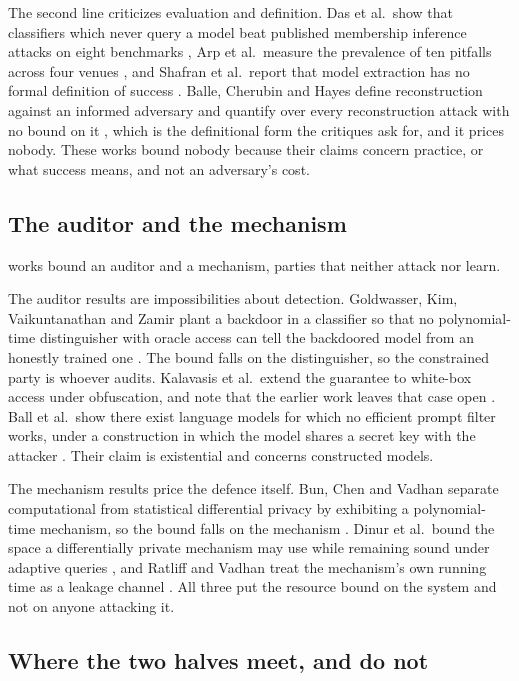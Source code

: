 The second line criticizes evaluation and definition. Das et al.\ show that
classifiers which never query a model beat published membership inference
attacks on eight benchmarks \cite{DZT25}, Arp et al.\ measure the prevalence
of ten pitfalls across four venues \cite{AQPWPWCR22}, and Shafran et al.\
report that model extraction has no formal definition of success
\cite{SSEP24}. Balle, Cherubin and Hayes define reconstruction against an
informed adversary and quantify over every reconstruction attack with no bound
on it \cite{BCH22}, which is the definitional form the critiques ask for, and
it prices nobody. These works bound nobody because their claims concern
practice, or what success means, and not an adversary's cost.

\subsection{The auditor and the mechanism}

\AuditorBound{} works bound an auditor and \MechanismBound{} a mechanism,
parties that neither attack nor learn.

The auditor results are impossibilities about detection. Goldwasser, Kim,
Vaikuntanathan and Zamir plant a backdoor in a classifier so that no
polynomial-time distinguisher with oracle access can tell the backdoored model
from an honestly trained one \cite{GKVZ22}. The bound falls on the
distinguisher, so the constrained party is whoever audits. Kalavasis et al.\
extend the guarantee to white-box access under obfuscation, and note that the
earlier work leaves that case open \cite{KKOSVZ24}. Ball et al.\ show there
exist language models for which no efficient prompt filter works, under a
construction in which the model shares a secret key with the attacker
\cite{BGGKRR26}. Their claim is existential and concerns constructed models.

The mechanism results price the defence itself. Bun, Chen and Vadhan separate
computational from statistical differential privacy by exhibiting a
polynomial-time mechanism, so the bound falls on the mechanism \cite{BCV16}.
Dinur et al.\ bound the space a differentially private mechanism may use while
remaining sound under adaptive queries \cite{DSWZ23}, and Ratliff and Vadhan
treat the mechanism's own running time as a leakage channel \cite{RV24}. All
three put the resource bound on the system and not on anyone attacking it.

\subsection{Where the two halves meet, and do not}

